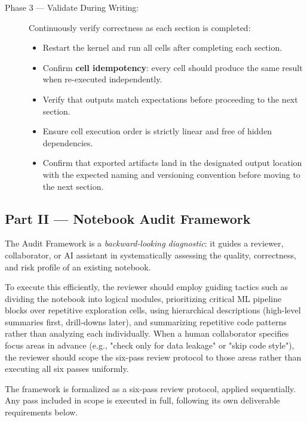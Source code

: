 \documentclass[11pt, a4paper]{article}
\begin{document}
\begin{description}
	\item[Phase 3 — Validate During Writing:]
	Continuously verify correctness as each section is completed:
	\begin{itemize}
		\item Restart the kernel and run all cells after completing
		each section.
		\item Confirm \textbf{cell idempotency}: every cell should
		produce the same result when re-executed independently.
		\item Verify that outputs match expectations before proceeding
		to the next section.
		\item Ensure cell execution order is strictly linear
		and free of hidden dependencies.
		\item Confirm that exported artifacts land in the designated
		output location with the expected naming and versioning
		convention before moving to the next section.
	\end{itemize}
	
\end{description}

\subsection*{Part II — Notebook Audit Framework}

The Audit Framework is a \textit{backward-looking diagnostic}: it guides
a reviewer, collaborator, or AI assistant in systematically assessing the
quality, correctness, and risk profile of an existing notebook.

To execute this efficiently, the reviewer should employ guiding tactics
such as dividing the notebook into logical modules, prioritizing critical
ML pipeline blocks over repetitive exploration cells, using hierarchical
descriptions (high-level summaries first, drill-downs later), and
summarizing repetitive code patterns rather than analyzing each
individually. When a human collaborator specifies focus areas in advance
(e.g., "check only for data leakage" or "skip code style"), the reviewer
should scope the six-pass review protocol to those areas rather than
executing all six passes uniformly.

The framework is formalized as a six-pass review protocol, applied
sequentially. Any pass included in scope is executed in full, following
its own deliverable requirements below.
\end{document}
